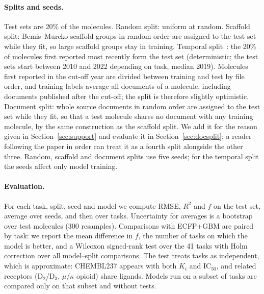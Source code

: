 \paragraph{Splits and seeds.}
Test sets are 20\% of the molecules. Random split: uniform at random. Scaffold split: Bemis--Murcko scaffold groups in random order are assigned to the test set while they fit, so large scaffold groups stay in training. Temporal split~\cite{sheridan2013timesplit}: the 20\% of molecules first reported most recently form the test set (deterministic; the test sets start between 2010 and 2022 depending on task, median 2019). Molecules first reported in the cut-off year are divided between training and test by file order, and training labels average all documents of a molecule, including documents published after the cut-off; the split is therefore slightly optimistic. Document split: whole source documents in random order are assigned to the test set while they fit, so that a test molecule shares no document with any training molecule, by the same construction as the scaffold split. We add it for the reason given in Section~\ref{sec:support} and evaluate it in Section~\ref{sec:docsplit}; a reader following the paper in order can treat it as a fourth split alongside the other three. Random, scaffold and document splits use five seeds; for the temporal split the seeds affect only model training.

\paragraph{Evaluation.}
For each task, split, seed and model we compute RMSE, $R^2$ and $f$ on the test set, average over seeds, and then over tasks. Uncertainty for averages is a bootstrap over test molecules (300 resamples). Comparisons with ECFP+GBM are paired by task: we report the mean difference in $f$, the number of tasks on which the model is better, and a Wilcoxon signed-rank test over the 41 tasks with Holm correction over all model--split comparisons. The test treats tasks as independent, which is approximate: CHEMBL237 appears with both $K_i$ and $\mathrm{IC}_{50}$, and related receptors (D$_2$/D$_3$, $\mu$/$\kappa$ opioid) share ligands. Models run on a subset of tasks are compared only on that subset and without tests.
